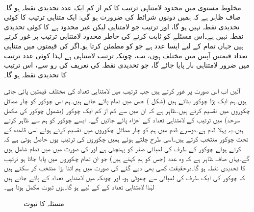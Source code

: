 \quad {}\\
مخلوط مستوی میں محدود لامتناہی ترتیب  کا کم از کم ایک عدد تحدیدی نقطہ ہو گا۔
\quad
صاف ظاہر ہے کہ ہمیں دونوں شرائط کی ضرورت ہو گی: ایک متناہی ترتیب کا کوئی تحدیدی نقطہ نہیں ہو گا، اور ترتیب  جو لامتناہی لیکن غیر محدود ہے کا کوئی تحدیدی نقطہ نہیں ہے۔اس مسئلے کو ثابت کرنے کی خاطر محدود لامتناہی ترتیب  پر غور کرتے ہیں جہاں تمام  کے لیے  ایسا عدد ہے جو  کو مطمئن کرتا ہو۔اگر  کی قیمتوں میں متناہی تعداد قیمتیں آپس میں مختلف ہوں، تب، چونکہ ترتیب لامتناہی ہے لہٰذا کوئی عدد  ترتیب میں ضرور لامتناہی بار پایا جائے گا، جو  تحدیدی نقطہ کی تعریف کی رو سے، اس ترتیب کا تحدیدی نقطہ ہو گا۔

آئیں اب اس صورت پر غور کرتے ہیں جب ترتیب میں لامتناہی تعداد کی مختلف قیمتیں پائی جاتی ہوں۔ہم ایک بڑا چوکور  بناتے ہیں  (شکل ) جس میں تمام  پائے جاتے ہیں۔ہم اس چوکور کو چار مماثل  چکوروں میں تقسیم کرتے ہیں۔ظاہر ہے کہ ان میں سے کم از کم ایک چوکور (بشمول چوکور کی مکمل سرحد) میں ترتیب کے لامتناہی تعداد کے اجزاء پائے جائیں گے۔ ایسے چوکور کو ہم  سے ظاہر کرتے ہیں۔یہ پہلا قدم ہے۔دوسرے قدم میں ہم  کو چار مماثل چکوروں میں تقسیم کرتے ہوئے اسی قاعدہ کے تحت چوکور  منتخب کرتے ہیں۔اسی طرح چلتے ہوئے ہمیں چکوروں کی ترتیب 
 یوں حاصل ہوتی ہے کہ  کرتے ہوئے چوکور  کے طرف کی لمبائی صفر کو پہنچتی ہے اور  کی صورت میں  میں تمام  شامل ہوں گے۔یہاں صاف ظاہر ہے کہ  وہ عدد (جس کو ہم  کہتے ہیں) جو ان تمام چکوروں میں پایا جاتا ہو ترتیب کا تحدیدی نقطہ ہو گا۔درحقیقت کسی بھی دیے گئے  کی صورت میں ہم  اتنا بڑا منتخب کر سکتے ہیں کہ  چوکور  کی  ایک طرف کی لمبائی  سے چھوٹی ہو، اور چونکہ  میں لامتناہی تعداد کے  پائے جاتے ہیں لہٰذا  لامتناہی تعداد کے  کے لیے  ہو گا۔یوں ثبوت مکمل ہوتا ہے۔
\begin{figure}
\centering
{}
\caption{مسئلہ  کا ثبوت}
\label{شکل_مسئلہ_ترتیب_بلزانو_وائشسٹراس}
\end{figure}


